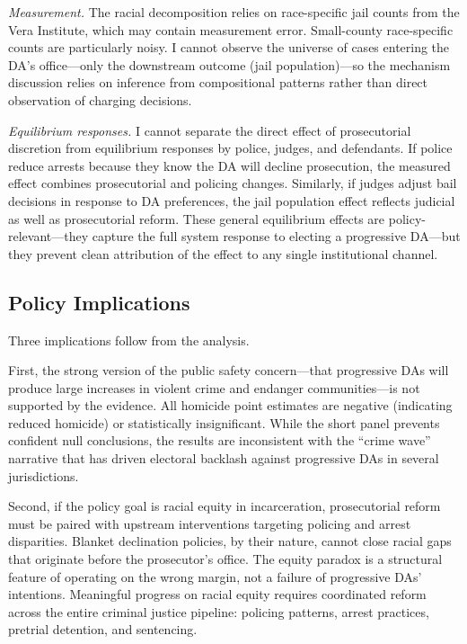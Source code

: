 \documentclass[12pt]{article}
\begin{document}
\textit{Measurement.} The racial decomposition relies on race-specific jail counts from the Vera Institute, which may contain measurement error. Small-county race-specific counts are particularly noisy. I cannot observe the universe of cases entering the DA's office---only the downstream outcome (jail population)---so the mechanism discussion relies on inference from compositional patterns rather than direct observation of charging decisions.

\textit{Equilibrium responses.} I cannot separate the direct effect of prosecutorial discretion from equilibrium responses by police, judges, and defendants. If police reduce arrests because they know the DA will decline prosecution, the measured effect combines prosecutorial and policing changes. Similarly, if judges adjust bail decisions in response to DA preferences, the jail population effect reflects judicial as well as prosecutorial reform. These general equilibrium effects are policy-relevant---they capture the full system response to electing a progressive DA---but they prevent clean attribution of the effect to any single institutional channel.

\subsection{Policy Implications}

Three implications follow from the analysis.

First, the strong version of the public safety concern---that progressive DAs will produce large increases in violent crime and endanger communities---is not supported by the evidence. All homicide point estimates are negative (indicating reduced homicide) or statistically insignificant. While the short panel prevents confident null conclusions, the results are inconsistent with the ``crime wave'' narrative that has driven electoral backlash against progressive DAs in several jurisdictions.

Second, if the policy goal is racial equity in incarceration, prosecutorial reform must be paired with upstream interventions targeting policing and arrest disparities. Blanket declination policies, by their nature, cannot close racial gaps that originate before the prosecutor's office. The equity paradox is a structural feature of operating on the wrong margin, not a failure of progressive DAs' intentions. Meaningful progress on racial equity requires coordinated reform across the entire criminal justice pipeline: policing patterns, arrest practices, pretrial detention, and sentencing.
\end{document}
